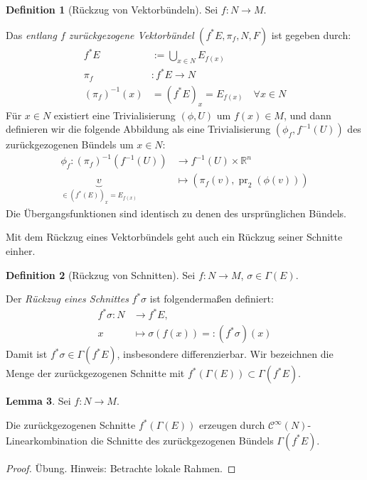 \documentclass[a4paper]{scrbook}
\numberwithin{equation}{chapter}
\DeclareMathOperator{\pr}{pr}
\newcommand{\R}{\mathbb{R}}
\newcommand{\sC}{\mathcal{C}^{\infty}}
\theoremstyle{definition}
\newtheorem{defn}{Definition}[section]
\newtheorem{lemma}[defn]{Lemma}
\begin{document}
		\begin{defn}[Rückzug von Vektorbündeln]
			Sei $f\colon N\rightarrow M$.
			
			Das \emph{entlang $f$ zurückgezogene Vektorbündel} $(f^*E,\pi_f,N, F)$ ist gegeben durch:
			\begin{align*}
				f^*E&:=\bigcup _{x\in N} E_{f(x)}\\
				\pi_f&\colon f^*E\rightarrow N\\
				(\pi_f)^{-1}(x)&=(f^*E)_x=E_{f(x)}\quad\forall x\in N
			\end{align*}
			Für $x\in N$ existiert eine Trivialisierung $(\phi,U)$ um $f(x)\in M$, und dann definieren wir die folgende Abbildung als eine Trivialisierung $(\phi_f,f^{-1}(U))$ des zurückgezogenen Bündels um $x\in N$:
			\begin{align*}
				\phi_f \colon (\pi_f)^{-1}(f^{-1}(U))&\rightarrow f^{-1}(U)\times\R^n\\
				\underbrace{v}_{\in (f^*(E))_x=E_{f(x)}}&\mapsto (\pi_f(v),\pr_2(\phi(v)))
			\end{align*}
			Die Übergangsfunktionen sind identisch zu denen des ursprünglichen Bündels.
		\end{defn}
		Mit dem Rückzug eines Vektorbündels geht auch ein Rückzug seiner Schnitte einher.
		\begin{defn}[Rückzug von Schnitten]
			Sei $f:N\rightarrow M$, $\sigma\in\Gamma(E)$.
			
			Der \emph{Rückzug eines Schnittes} $f^*\sigma$ ist folgendermaßen definiert:
			\begin{align*}
				f^*\sigma\colon N &\rightarrow f^*E,\\
				x &\mapsto \sigma(f(x))=: (f^*\sigma)(x)
			\end{align*}
			Damit ist $f^*\sigma\in\Gamma(f^*E)$, insbesondere differenzierbar. Wir bezeichnen die Menge der zurückgezogenen Schnitte mit $f^*(\Gamma(E))\subset\Gamma(f^*E)$.
		\end{defn}
		\begin{lemma}\label{lemma:Zurückziehen_von_Schnitten}
			Sei $f:N\rightarrow M$.
			
			Die zurückgezogenen Schnitte $f^*(\Gamma(E))$ erzeugen durch $\sC(N)$-Linearkombination die Schnitte des zurückgezogenen Bündels $\Gamma(f^*E)$.
			\begin{proof}
				Übung. Hinweis: Betrachte lokale Rahmen.
			\end{proof}
		\end{lemma}


\end{document}
